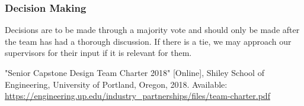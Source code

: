 \documentclass{article}
\begin{document}
\subsubsection*{Decision Making} 

Decisions are to be made through a majority vote and should only be made after the
team has had a thorough discussion. If there is a tie, we may approach our
supervisors for their input if it is relevant for them.

\newpage{}

\begin{thebibliography}{1}
   "Senior Capstone Design Team Charter 2018" [Online], Shiley School of Engineering, University of Portland, Oregon, 2018. Available: \url{https://engineering.up.edu/industry_partnerships/files/team-charter.pdf}
\end{thebibliography}
\end{document}
